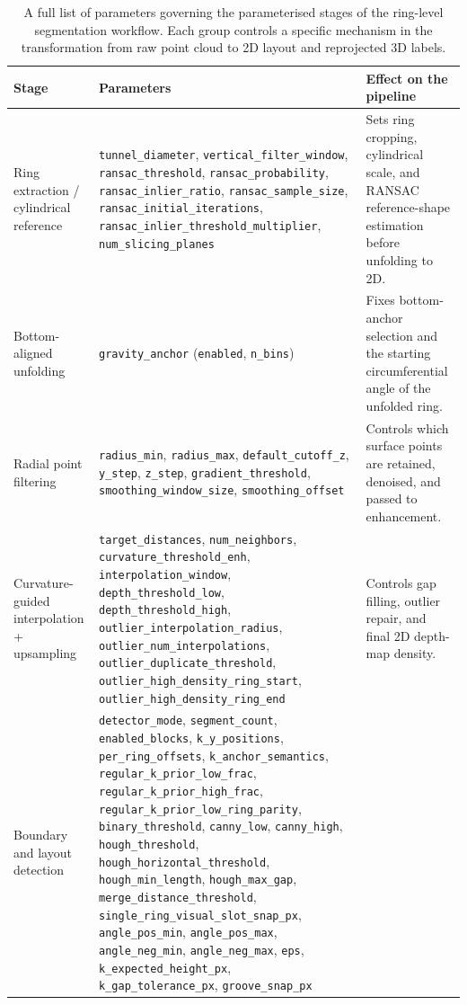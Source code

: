 \documentclass[a4paper,fleqn]{cas-dc}
\begin{document}
{%
\begin{table}[t]
\caption{
A full list of parameters governing the parameterised stages of the ring-level segmentation workflow.
Each group controls a specific mechanism in the transformation from raw point cloud to 2D layout and reprojected 3D labels.
}
\label{tab:workflow_full_parameters}
\centering
\footnotesize
\begin{tabular}{p{}p{}p{}}
\toprule
Stage & Parameters & Effect on the pipeline \\
\midrule
Ring extraction / cylindrical reference
& \texttt{tunnel\_diameter}, \texttt{vertical\_filter\_window}, \texttt{ransac\_threshold}, \texttt{ransac\_probability}, \texttt{ransac\_inlier\_ratio}, \texttt{ransac\_sample\_size}, \texttt{ransac\_initial\_iterations}, \texttt{ransac\_inlier\_threshold\_multiplier}, \texttt{num\_slicing\_planes}
& Sets ring cropping, cylindrical scale, and RANSAC reference-shape estimation before unfolding to 2D. \\
\addlinespace
Bottom-aligned unfolding
& \texttt{gravity\_anchor} (\texttt{enabled}, \texttt{n\_bins})
& Fixes bottom-anchor selection and the starting circumferential angle of the unfolded ring. \\
\addlinespace
Radial point filtering
& \texttt{radius\_min}, \texttt{radius\_max}, \texttt{default\_cutoff\_z}, \texttt{y\_step}, \texttt{z\_step}, \texttt{gradient\_threshold}, \texttt{smoothing\_window\_size}, \texttt{smoothing\_offset}
& Controls which surface points are retained, denoised, and passed to enhancement. \\
\addlinespace
Curvature-guided interpolation + upsampling
& \texttt{target\_distances}, \texttt{num\_neighbors}, \texttt{curvature\_threshold\_enh}, \texttt{interpolation\_window}, \texttt{depth\_threshold\_low}, \texttt{depth\_threshold\_high}, \texttt{outlier\_interpolation\_radius}, \texttt{outlier\_num\_interpolations}, \texttt{outlier\_duplicate\_threshold}, \texttt{outlier\_high\_density\_ring\_start}, \texttt{outlier\_high\_density\_ring\_end}
& Controls gap filling, outlier repair, and final 2D depth-map density. \\
\addlinespace
Boundary and layout detection
& \texttt{detector\_mode}, \texttt{segment\_count}, \texttt{enabled\_blocks}, \texttt{k\_y\_positions}, \texttt{per\_ring\_offsets}, \texttt{k\_anchor\_semantics}, \texttt{regular\_k\_prior\_low\_frac}, \texttt{regular\_k\_prior\_high\_frac}, \texttt{regular\_k\_prior\_low\_ring\_parity}, \texttt{binary\_threshold}, \texttt{canny\_low}, \texttt{canny\_high}, \texttt{hough\_threshold}, \texttt{hough\_horizontal\_threshold}, \texttt{hough\_min\_length}, \texttt{hough\_max\_gap}, \texttt{merge\_distance\_threshold}, \texttt{single\_ring\_visual\_slot\_snap\_px}, \texttt{angle\_pos\_min}, \texttt{angle\_pos\_max}, \texttt{angle\_neg\_min}, \texttt{angle\_neg\_max}, \texttt{eps}, \texttt{k\_expected\_height\_px}, \texttt{k\_gap\_tolerance\_px}, \texttt{groove\_snap\_px}

\end{tabular}
\end{table}}
\end{document}
